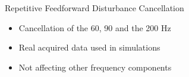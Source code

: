 \documentclass[10pt]{beamer}
\begin{document}
\begin{frame}{Repetitive Feedforward Disturbance Cancellation}
  \begin{itemize}
    \item Cancellation of the 60, 90 and the 200 Hz
    \item Real acquired data used in simulations
    \item Not affecting other frequency components
  \end{itemize}
  \begin{figure}[h!]
  \end{figure}
\end{frame}
\end{document}
